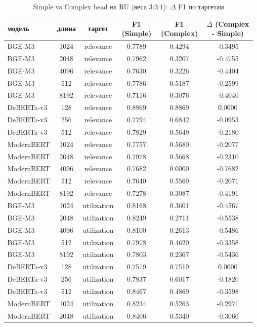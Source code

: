\begin{table}
\caption{Simple vs Complex head на RU (веса 3:3:1): $\Delta$ F1 по таргетам}
\label{tab:simple_vs_complex}
\begin{tabular}{lccccc}
\toprule
модель & длина & таргет & F1 (Simple) & F1 (Complex) & $\Delta$ (Complex - Simple) \\
\midrule
BGE-M3 & 1024 & relevance & 0.7789 & 0.4294 & -0.3495 \\
BGE-M3 & 2048 & relevance & 0.7962 & 0.3207 & -0.4755 \\
BGE-M3 & 4096 & relevance & 0.7630 & 0.3226 & -0.4404 \\
BGE-M3 & 512 & relevance & 0.7786 & 0.5187 & -0.2599 \\
BGE-M3 & 8192 & relevance & 0.7116 & 0.3076 & -0.4040 \\
DeBERTa-v3 & 128 & relevance & 0.8869 & 0.8869 & 0.0000 \\
DeBERTa-v3 & 256 & relevance & 0.7794 & 0.6842 & -0.0953 \\
DeBERTa-v3 & 512 & relevance & 0.7829 & 0.5649 & -0.2180 \\
ModernBERT & 1024 & relevance & 0.7757 & 0.5680 & -0.2077 \\
ModernBERT & 2048 & relevance & 0.7978 & 0.5668 & -0.2310 \\
ModernBERT & 4096 & relevance & 0.7682 & 0.0000 & -0.7682 \\
ModernBERT & 512 & relevance & 0.7640 & 0.5569 & -0.2071 \\
ModernBERT & 8192 & relevance & 0.7278 & 0.3087 & -0.4191 \\
BGE-M3 & 1024 & utilization & 0.8168 & 0.3601 & -0.4567 \\
BGE-M3 & 2048 & utilization & 0.8249 & 0.2711 & -0.5538 \\
BGE-M3 & 4096 & utilization & 0.8100 & 0.2613 & -0.5486 \\
BGE-M3 & 512 & utilization & 0.7978 & 0.4620 & -0.3358 \\
BGE-M3 & 8192 & utilization & 0.7803 & 0.2367 & -0.5436 \\
DeBERTa-v3 & 128 & utilization & 0.7519 & 0.7519 & 0.0000 \\
DeBERTa-v3 & 256 & utilization & 0.7837 & 0.6017 & -0.1820 \\
DeBERTa-v3 & 512 & utilization & 0.8467 & 0.4869 & -0.3598 \\
ModernBERT & 1024 & utilization & 0.8234 & 0.5263 & -0.2971 \\
ModernBERT & 2048 & utilization & 0.8406 & 0.5340 & -0.3066 \\

\end{tabular}
\end{table}
